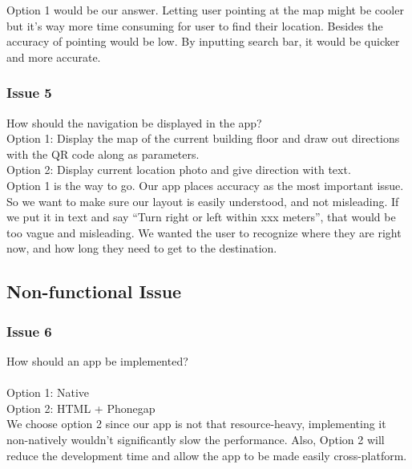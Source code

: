 \documentclass[12pt]{article}
\begin{document}
Option 1 would be our answer. Letting user pointing at the map might be cooler but it’s way more time consuming for user to find their location. Besides the accuracy of pointing would be low. By inputting search bar, it would be quicker and more accurate. 

\subsubsection{Issue 5}
How should the navigation be displayed in the app? \\

Option 1: Display the map of the current building floor and draw out directions with the QR code along as parameters. \\
Option 2: Display current location photo and give direction with text. \\

Option 1 is the way to go.  Our app places accuracy as the most important issue. So we want to make sure our layout is easily understood, and not misleading. If we put it in text and say “Turn right or left within xxx meters”, that would be too vague and misleading. We wanted the user to recognize where they are right now, and how long they need to get to the destination.



\subsection{Non-functional Issue}
\subsubsection{Issue 6}
How should an app be implemented?  \\ \\
Option 1: Native  \\
Option 2: HTML + Phonegap \\

We choose option 2 since our app is not that resource-heavy, implementing it non-natively wouldn’t significantly slow the performance. Also, Option 2 will reduce the development time and allow the app to be made easily cross-platform.
\end{document}
